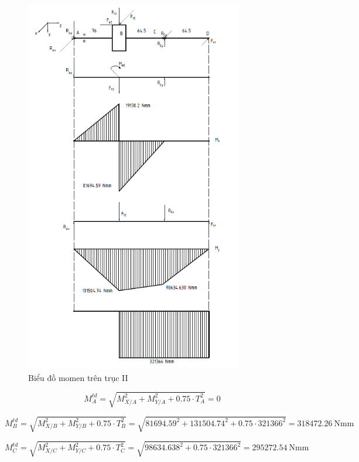\begin{figure}[H]
    \centering
    \includegraphics[width=0.85\textwidth]{pictures/momen2.png}
    \caption{Biểu đồ momen trên trục II}
\end{figure}
\begin{equation}
    M_A^{td} 
    = \sqrt{M_{X/A}^2 + M_{Y/A}^2 + 0.75 \cdot T_A^2} 
    = 0
\end{equation}

\[
    M_B^{td} 
    = \sqrt{M_{X/B}^2 + M_{Y/B}^2 + 0.75 \cdot T_B^2} 
    = \sqrt{81694.59^2 + 131504.74^2 + 0.75 \cdot 321366^2} 
    = 318472.26\ \text{Nmm}
\]

\[
    M_C^{td} 
    = \sqrt{M_{X/C}^2 + M_{Y/C}^2 + 0.75 \cdot T_C^2} 
    = \sqrt{98634.638^2 + 0.75 \cdot 321366^2} 
    = 295272.54\ \text{Nmm}
\]

